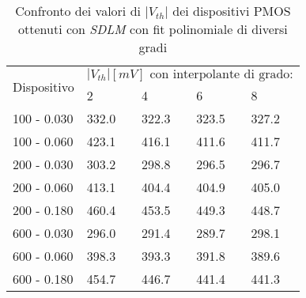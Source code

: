   \begin{table}[h]
    \renewcommand{\arraystretch}{1.3}
    \centering
    \begin{tabular}{m{2.1cm} m{2cm} m{2cm} m{2cm} m{2cm}}
      \toprule
      \multirow{2}{*}{Dispositivo} & \multicolumn{4}{c}{$|V_{th}| [mV] \text{ con interpolante di grado:}$}                         \\
      \cmidrule{2-5}
                                  & 2                                                                    & 4     & 6     & 8     \\
      \midrule
      100 - 0.030                  & 332.0                                                                & 322.3 & 323.5 & 327.2 \\
      \hline
      100 - 0.060                  & 423.1                                                                & 416.1 & 411.6 & 411.7 \\
      \hline
      200 - 0.030                  & 303.2                                                                & 298.8 & 296.5 & 296.7 \\
      \hline
      200 - 0.060                  & 413.1                                                                & 404.4 & 404.9 & 405.0 \\
      \hline
      200 - 0.180                  & 460.4                                                                & 453.5 & 449.3 & 448.7 \\
      \hline
      600 - 0.030                  & 296.0                                                                & 291.4 & 289.7 & 298.1 \\
      \hline
      600 - 0.060                  & 398.3                                                                & 393.3 & 391.8 & 389.6 \\
      \hline
      600 - 0.180                  & 454.7                                                                & 446.7 & 441.4 & 441.3 \\
      \hline
    \end{tabular}
    \caption[Confronto $|V_{th}|$ al variare del grado del fit polinomiale con il metodo SDLM]{Confronto dei valori di $|V_{th}|$ dei dispositivi PMOS ottenuti con \emph{SDLM} con fit polinomiale di diversi gradi}
    \label{tab:GradiSDLM}
  \end{table}%


